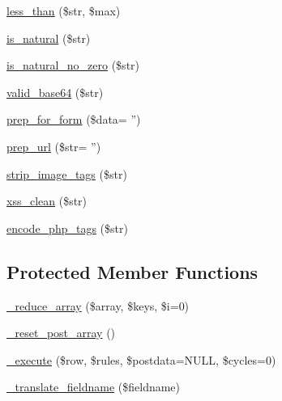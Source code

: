 \begin{DoxyCompactItemize}
\item 
\hyperlink{class_c_i___form__validation_a4f5222d1cc44e64ce520d94358f25291}{less\-\_\-than} (\$str, \$max)
\item 
\hyperlink{class_c_i___form__validation_aaf9d0b9bdaaef3658a78dd6a01629e5d}{is\-\_\-natural} (\$str)
\item 
\hyperlink{class_c_i___form__validation_ae4f399db6305e565bcf9acd70eea86a6}{is\-\_\-natural\-\_\-no\-\_\-zero} (\$str)
\item 
\hyperlink{class_c_i___form__validation_a9bec2f0a508e0327d4b048ecfc204522}{valid\-\_\-base64} (\$str)
\item 
\hyperlink{class_c_i___form__validation_a964633906e543eeb7851e78f1ed26da8}{prep\-\_\-for\-\_\-form} (\$data= '')
\item 
\hyperlink{class_c_i___form__validation_aa781d9b3c62b5e2803da073e926dca42}{prep\-\_\-url} (\$str= '')
\item 
\hyperlink{class_c_i___form__validation_abb836a42971c7bc641588db779c6ab1d}{strip\-\_\-image\-\_\-tags} (\$str)
\item 
\hyperlink{class_c_i___form__validation_abaca42462f9a4fb50e0eca55678e51e2}{xss\-\_\-clean} (\$str)
\item 
\hyperlink{class_c_i___form__validation_ae8fff4cb083a2a66c900f8bd61216bdd}{encode\-\_\-php\-\_\-tags} (\$str)
\end{DoxyCompactItemize}
\subsection*{Protected Member Functions}
\begin{DoxyCompactItemize}
\item 
\hyperlink{class_c_i___form__validation_a20ed7e44a35f5a5f6db5a6b220151df0}{\-\_\-reduce\-\_\-array} (\$array, \$keys, \$i=0)
\item 
\hyperlink{class_c_i___form__validation_a5cb72e21d23a62d15655b8caaa493698}{\-\_\-reset\-\_\-post\-\_\-array} ()
\item 
\hyperlink{class_c_i___form__validation_a00fc7d98650d07098dd4a13b486c3dea}{\-\_\-execute} (\$row, \$rules, \$postdata=N\-U\-L\-L, \$cycles=0)
\item 
\hyperlink{class_c_i___form__validation_ae6b1edc93754376c05622d905845c215}{\-\_\-translate\-\_\-fieldname} (\$fieldname)
\end{DoxyCompactItemize}
